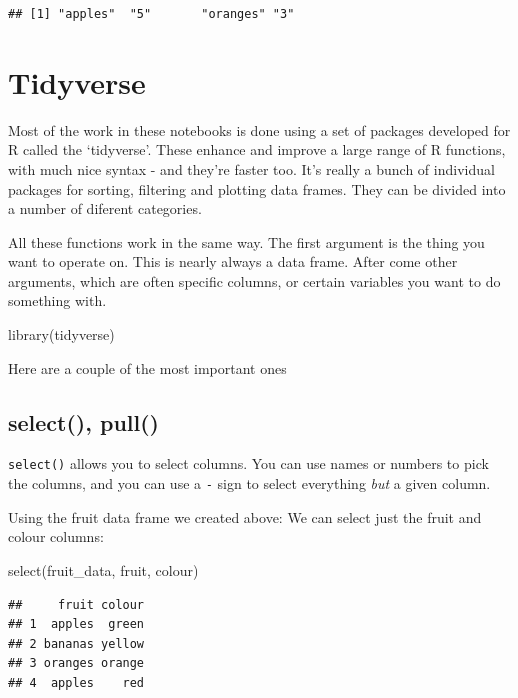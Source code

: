 \documentclass[
]{book}
\newenvironment{Shaded}{\begin{snugshade}}{\end{snugshade}}
\newcommand{\FunctionTok}[1]{\textcolor[rgb]{0.00,0.00,0.00}{#1}}
\newcommand{\NormalTok}[1]{#1}
\begin{document}
\begin{verbatim}
## [1] "apples"  "5"       "oranges" "3"
\end{verbatim}

\hypertarget{tidyverse}{%
\section{Tidyverse}\label{tidyverse}}

Most of the work in these notebooks is done using a set of packages developed for R called the `tidyverse'. These enhance and improve a large range of R functions, with much nice syntax - and they're faster too. It's really a bunch of individual packages for sorting, filtering and plotting data frames. They can be divided into a number of diferent categories.

All these functions work in the same way. The first argument is the thing you want to operate on. This is nearly always a data frame. After come other arguments, which are often specific columns, or certain variables you want to do something with.

\begin{Shaded}
\begin{Highlighting}[]
\FunctionTok{library}\NormalTok{(tidyverse)}
\end{Highlighting}
\end{Shaded}

Here are a couple of the most important ones

\hypertarget{select-pull}{%
\subsection{select(), pull()}\label{select-pull}}

\texttt{select()} allows you to select columns. You can use names or numbers to pick the columns, and you can use a \texttt{-} sign to select everything \emph{but} a given column.

Using the fruit data frame we created above: We can select just the fruit and colour columns:

\begin{Shaded}
\begin{Highlighting}[]
\FunctionTok{select}\NormalTok{(fruit\_data, fruit, colour)}
\end{Highlighting}
\end{Shaded}

\begin{verbatim}
##     fruit colour
## 1  apples  green
## 2 bananas yellow
## 3 oranges orange
## 4  apples    red
\end{verbatim}
\end{document}
